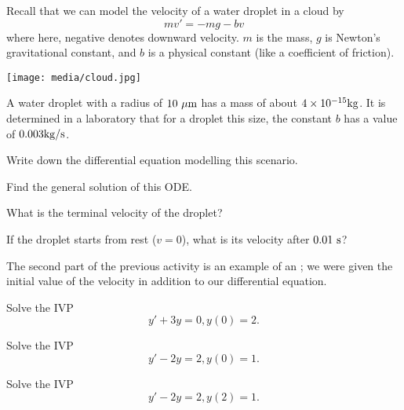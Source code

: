 

\begin{applicationActivities}



\begin{observation}
Recall that we can model the velocity of a water droplet in a cloud by
\[mv'=-mg-bv\]
where here, negative denotes downward velocity.  \(m\) is the mass, \(g\) is Newton's gravitational constant, and \(b\) is a physical constant (like a coefficient of friction).
\begin{center}
\texttt{[image: media/cloud.jpg]}
\end{center}
\end{observation}

\begin{activity}{25}
A water droplet with a radius of \(10\ {\rm \mu m}\) has a mass of about \(4 \times 10^{-15} {\rm kg}\).  It is determined in a laboratory that for a droplet this size, the constant \(b\) has a value of \(0.003 {\rm kg/s}\).
\begin{subactivity}
Write down the differential equation modelling this scenario.
\end{subactivity}
\begin{subactivity}
Find the general solution of this ODE.
\end{subactivity}
\begin{subactivity}
What is the terminal velocity of the droplet?
\end{subactivity}
\begin{subactivity}If the droplet starts from rest (\(v=0\)), what is its velocity after \(0.01\ {\rm s}\)?
\end{subactivity}
\end{activity}

\begin{definition}
The second part of the previous activity is an example of an ; we were given the initial value of the velocity in addition to our differential equation.
\end{definition}

\begin{activity}{10}
Solve the IVP
\[y'+3y=0, y(0)=2.\]
\end{activity}

\begin{activity}{10}
Solve the IVP
\[y'-2y=2, y(0)=1.\]
\end{activity}

\begin{activity}{5}
Solve the IVP
\[y'-2y=2, y(2)=1.\]
\end{activity}




\end{applicationActivities}
